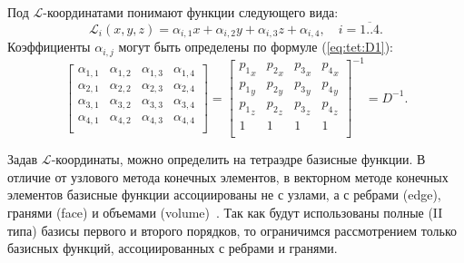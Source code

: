 \documentclass[a4paper,14pt]{article}
\begin{document}
\noindent Под $\mathcal{L}$-координатами понимают функции следующего вида:
\begin{equation*}
	\mathcal{L}_i (x, y, z) = \alpha_{i, 1} x + \alpha_{i, 2} y + \alpha_{i, 3} z + \alpha_{i, 4} , \text{~~~} i = \overline{1..4} . \label{eq:tet:L}
\end{equation*}
Коэффициенты $\alpha_{i, j}$ могут быть определены по формуле (\ref{eq:tet:D1}):
\begin{equation}
	\left[
	\begin{matrix}
		\alpha_{1, 1} & \alpha_{1, 2} & \alpha_{1, 3} & \alpha_{1, 4} \\
		\alpha_{2, 1} & \alpha_{2, 2} & \alpha_{2, 3} & \alpha_{2, 4} \\
		\alpha_{3, 1} & \alpha_{3, 2} & \alpha_{3, 3} & \alpha_{3, 4} \\
		\alpha_{4, 1} & \alpha_{4, 2} & \alpha_{4, 3} & \alpha_{4, 4} \\
	\end{matrix}
	\right] = \left[
	\begin{matrix}
		{p_1}_x & {p_2}_x & {p_3}_x & {p_4}_x \\
		{p_1}_y & {p_2}_y & {p_3}_y & {p_4}_y \\
		{p_1}_z & {p_2}_z & {p_3}_z & {p_4}_z \\
		1 & 1 & 1 & 1 \\
	\end{matrix}
	\right]^{-1} = D^{-1} . \label{eq:tet:D1}
\end{equation}

Задав $\mathcal{L}$-координаты, можно определить на тетраэдре базисные функции. В отличие от узлового метода конечных элементов, в векторном методе конечных элементов базисные функции ассоциированы не с узлами, а с ребрами (edge), гранями (face) и объемами (volume)~\citep{nechaev, webb1999}. Так как будут использованы полные (II типа) базисы первого и второго порядков, то ограничимся рассмотрением только базисных функций, ассоциированных с ребрами и гранями.
\end{document}
